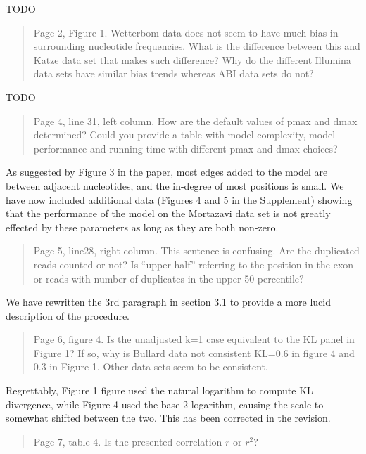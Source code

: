 \documentclass{article}
\begin{document}
TODO

\begin{quote}
Page 2, Figure 1. Wetterbom data does not seem to have much bias in surrounding
nucleotide frequencies. What is the difference between this and Katze data set
that makes such difference? Why do the different Illumina data sets have similar
bias trends whereas ABI data sets do not?
\end{quote}

TODO



\begin{quote}
Page 4, line 31, left column. How are the default values of pmax and dmax
determined? Could you provide a table with model complexity, model performance
and running time with different pmax and dmax choices?
\end{quote}

As suggested by Figure 3 in the paper, most edges added to the model are between
adjacent nucleotides, and the in-degree of most positions is small.  We have now
included additional data (Figures 4 and 5 in the Supplement) showing that the
performance of the model on the Mortazavi data set is not greatly effected by
these parameters as long as they are both non-zero.


\begin{quote}
Page 5, line28, right column. This sentence is confusing. Are the duplicated
reads counted or not? Is “upper half” referring to the position in the exon or
reads with number of duplicates in the upper 50 percentile?
\end{quote}

We have rewritten the 3rd paragraph in section 3.1 to provide a more lucid
description of the procedure.

\begin{quote}
Page 6, figure 4. Is the unadjusted k=1 case equivalent to the KL panel in
Figure 1? If so, why is Bullard data not consistent KL=0.6 in figure 4 and 0.3
in Figure 1. Other data sets seem to be consistent.
\end{quote}

Regrettably, Figure 1 figure used the natural logarithm to compute KL
divergence, while Figure 4 used the base 2 logarithm, causing the scale to
somewhat shifted between the two. This has been corrected in the revision.


\begin{quote}
Page 7, table 4. Is the presented correlation $r$ or $r^2$?
\end{quote}
\end{document}
